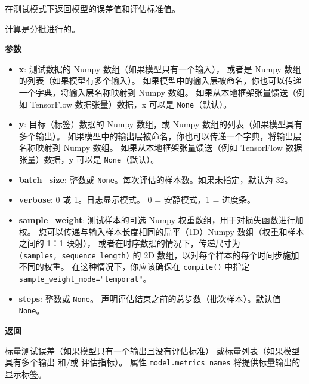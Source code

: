 在测试模式下返回模型的误差值和评估标准值。

计算是分批进行的。

\textbf{参数}

\begin{itemize}
\tightlist
\item
  \textbf{x}: 测试数据的 Numpy 数组（如果模型只有一个输入）， 或者是
  Numpy 数组的列表（如果模型有多个输入）。
  如果模型中的输入层被命名，你也可以传递一个字典，将输入层名称映射到
  Numpy 数组。 如果从本地框架张量馈送（例如 TensorFlow 数据张量）数据，x
  可以是 \texttt{None}（默认）。
\item
  \textbf{y}: 目标（标签）数据的 Numpy 数组，或 Numpy
  数组的列表（如果模型具有多个输出）。
  如果模型中的输出层被命名，你也可以传递一个字典，将输出层名称映射到
  Numpy 数组。 如果从本地框架张量馈送（例如 TensorFlow 数据张量）数据，y
  可以是 \texttt{None}（默认）。
\item
  \textbf{batch\_size}: 整数或
  \texttt{None}。每次评估的样本数。如果未指定，默认为 32。
\item
  \textbf{verbose}: 0 或 1。日志显示模式。 0 = 安静模式，1 = 进度条。
\item
  \textbf{sample\_weight}: 测试样本的可选 Numpy
  权重数组，用于对损失函数进行加权。
  您可以传递与输入样本长度相同的扁平（1D）Numpy 数组（权重和样本之间的
  1：1 映射）， 或者在时序数据的情况下，传递尺寸为
  \texttt{(samples,\ sequence\_length)} 的 2D
  数组，以对每个样本的每个时间步施加不同的权重。
  在这种情况下，你应该确保在 \texttt{compile()} 中指定
  \texttt{sample\_weight\_mode="temporal"}。
\item
  \textbf{steps}: 整数或 \texttt{None}。
  声明评估结束之前的总步数（批次样本）。默认值 \texttt{None}。
\end{itemize}

\textbf{返回}

标量测试误差（如果模型只有一个输出且没有评估标准）
或标量列表（如果模型具有多个输出 和/或 评估指标）。 属性
\texttt{model.metrics\_names} 将提供标量输出的显示标签。



\label{predict}

\begin{Shaded}
\begin{Highlighting}[]
\OperatorTok{=}\OperatorTok{=}\OperatorTok{=}\NormalTok{)}
\end{Highlighting}
\end{Shaded}

